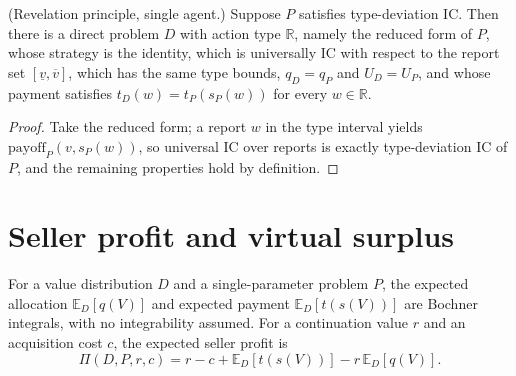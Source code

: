 \begin{theorem}\label{thm:MathEconLib.SingleParameterProblem.revelation_principle}\leanok
{}
(Revelation principle, single agent.) Suppose $P$ satisfies type-deviation IC. Then there is a direct problem $D$ with action type $\mathbb{R}$, namely the reduced form of $P$, whose strategy is the identity, which is universally IC with respect to the report set $[\underline v,\overline v]$, which has the same type bounds, $q_D=q_P$ and $U_D=U_P$, and whose payment satisfies $t_D(w)=t_P(s_P(w))$ for every $w\in\mathbb{R}$.
\end{theorem}
\begin{proof}\leanok
Take the reduced form; a report $w$ in the type interval yields $\mathrm{payoff}_P(v,s_P(w))$, so universal IC over reports is exactly type-deviation IC of $P$, and the remaining properties hold by definition.
\end{proof}

\section{Seller profit and virtual surplus}

\begin{definition}\label{def:MathEconLib.ValueDistribution.sellerProfit}\leanok
{}
For a value distribution $D$ and a single-parameter problem $P$, the expected allocation $\mathbb{E}_D[q(V)]$ and expected payment $\mathbb{E}_D[t(s(V))]$ are Bochner integrals, with no integrability assumed. For a continuation value $r$ and an acquisition cost $c$, the expected seller profit is
\[
\Pi(D,P,r,c)=r-c+\mathbb{E}_D[t(s(V))]-r\,\mathbb{E}_D[q(V)] .
\]
\end{definition}

